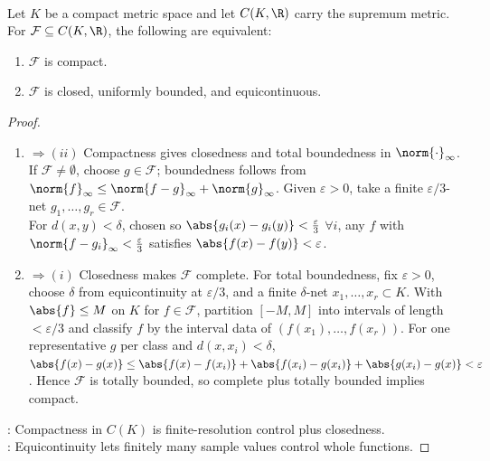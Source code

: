 \begin{theorem} \label{thm:arzela-ascoli-compact-subsets-c-k} \\
Let $K$ be a compact metric space and let $C(K,\R)$ carry the supremum metric.\\
For $\mathcal{F}\subseteq C(K,\R)$, the following are equivalent:
\begin{enumerate}[label=(\roman*)]
\setlength{\itemsep}{0pt}
\item $\mathcal{F}$ is compact.
\item $\mathcal{F}$ is closed, uniformly bounded, and equicontinuous.
\end{enumerate}
\begin{proof}
\begin{enumerate}[label=(\roman*)]
\setlength{\itemsep}{0pt}
\item[$(i)$]$\Rightarrow (ii)$ Compactness gives closedness and total boundedness in $\norm{\cdot}_{\infty}$. If $\mathcal{F}\neq\emptyset$, choose $g\in\mathcal{F}$; boundedness follows from $\norm{f}_{\infty}\leq\norm{f-g}_{\infty}+\norm{g}_{\infty}$. Given $\varepsilon>0$, take a finite $\varepsilon/3$-net $g_1,\ldots,g_r\in\mathcal{F}$.\\
For $d(x,y)<\delta$, chosen so $\abs{g_i(x)-g_i(y)}<\frac{\varepsilon}{3}$ $\forall i$, any $f$ with $\norm{f-g_i}_{\infty}<\frac{\varepsilon}{3}$ satisfies $\abs{f(x)-f(y)}<\varepsilon$.
\item[$(ii)$]$\Rightarrow (i)$ Closedness makes $\mathcal{F}$ complete. For total boundedness, fix $\varepsilon>0$, choose $\delta$ from equicontinuity at $\varepsilon/3$, and a finite $\delta$-net $x_1,\ldots,x_r\subset K$. With $\abs{f}\leq M$ on $K$ for $f\in\mathcal{F}$, partition $[-M,M]$ into intervals of length $<\varepsilon/3$ and classify $f$ by the interval data of $(f(x_1),\ldots,f(x_r))$. For one representative $g$ per class and $d(x,x_i)<\delta$, $\abs{f(x)-g(x)}\leq\abs{f(x)-f(x_i)}+\abs{f(x_i)-g(x_i)}+\abs{g(x_i)-g(x)}<\varepsilon$. Hence $\mathcal{F}$ is totally bounded, so complete plus totally bounded implies compact.
\end{enumerate}
: Compactness in $C(K)$ is finite-resolution control plus closedness.\\
: Equicontinuity lets finitely many sample values control whole functions.
\end{proof}
\end{theorem}

